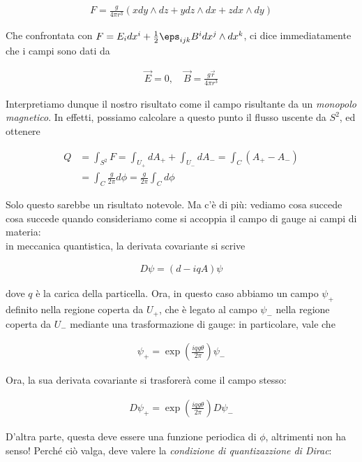 \documentclass{report}
\begin{document}
\begin{align}
    F = \frac{g}{4\pi r^3}\left(xdy\wedge dz + ydz \wedge dx + z dx \wedge dy \right)
\end{align}

Che confrontata con \(F = E_idx^i + \frac{1}{2}\eps_{ijk}B^i dx^j \wedge dx^k\), ci dice immediatamente che i campi sono dati da 

\begin{align}
    \vec{E} = 0,  \quad  \vec{B} = \frac{g \vec{r}}{4\pi r^3}
\end{align}

Interpretiamo dunque il nostro risultato come il campo risultante da un \emph{monopolo magnetico}. In effetti, possiamo calcolare a questo punto il flusso uscente da \(S^2\), ed ottenere 

\begin{align}
    Q &= \int_{S^2} F = \int_{U_+}dA_{+} + \int_{U_{-}}dA_{-} = \int_C (A_+ - A_-) \\
    &= \int_C \frac{g}{2\pi}d\phi = \frac{g}{2\pi}\int_C d\phi
\end{align}

Solo questo sarebbe un risultato notevole. Ma c'è di più: vediamo cosa succede cosa succede quando consideriamo come si accoppia il campo di gauge ai campi di materia: \\

in meccanica quantistica, la derivata covariante si scrive

\begin{align}
    D\psi = (d-iqA)\psi
\end{align}

dove \(q\) è la carica della particella. Ora, in questo caso abbiamo un campo \(\psi_+\) definito nella regione coperta da \(U_+\), che è legato al campo \(\psi_-\) nella regione coperta da \(U_-\) mediante una trasformazione di gauge: in particolare, vale che 

\begin{align}
    \psi_+ = \exp\left(\frac{iqg\theta}{2\pi}\right) \psi_-
\end{align}

Ora, la sua derivata covariante si trasforerà come il campo stesso: 

\begin{align}
    D\psi_+ = \exp\left(\frac{iqg\theta}{2\pi}\right) D\psi_-
\end{align}

D'altra parte, questa deve essere una funzione periodica di \(\phi\), altrimenti non ha senso! Perché ciò valga, deve valere la \emph{condizione di quantizazzione di Dirac}: 
\end{document}
